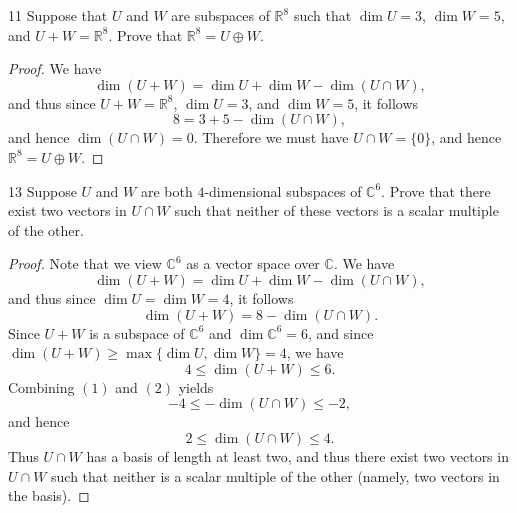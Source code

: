 \documentclass[11pt]{extarticle}
\newenvironment{problem}[1]{\begin{prob*}{#1}{}}{\end{prob*}}
\newcommand{\R}{\mathbb{R}}
\newcommand{\C}{\mathbb{C}}
\begin{document}
\begin{problem}{11}
Suppose that $U$ and $W$ are subspaces of $\R^8$ such that $\dim U = 3$, $\dim W = 5$, and $U+W=\R^8$.  Prove that $\R^8=U\oplus W$.  
\end{problem}
\begin{proof}
We have
\begin{equation*}
\dim(U + W) = \dim U + \dim W - \dim(U\cap W),
\end{equation*}
and thus since $U + W =\R^8$, $\dim U = 3$, and $\dim W = 5$, it follows
\begin{equation*}
8 = 3 + 5 - \dim(U\cap W),
\end{equation*}
and hence $\dim(U\cap W) = 0$.  Therefore we must have $U\cap W = \{0\}$, and hence $\R^8=U\oplus W$.
\end{proof}

\begin{problem}{13}
Suppose $U$ and $W$ are both $4$-dimensional subspaces of $\C^6$.  Prove that there exist two vectors in $U\cap W$ such that neither of these vectors is a scalar multiple of the other.
\end{problem}
\begin{proof}
Note that we view $\C^6$ as a vector space over $\C$.  We have
\begin{equation*}
\dim(U + W) = \dim U + \dim W - \dim(U\cap W),
\end{equation*}
and thus since $\dim U = \dim W = 4$, it follows
\begin{equation}
\dim(U+W) = 8  - \dim(U \cap W).
\end{equation}
Since $U+W$ is a subspace of $\C^6$ and $\dim \C^6 = 6$, and since $\dim(U+W)\geq \max\{\dim U, \dim W\} = 4$, we have
\begin{equation}
4\leq \dim(U + W)\leq 6.
\end{equation}
Combining $(1)$ and $(2)$ yields
\begin{equation*}
-4 \leq -\dim(U\cap W) \leq -2,
\end{equation*}
and hence 
\begin{equation*}
2 \leq \dim(U\cap W)\leq 4.
\end{equation*}
Thus $U\cap W$ has a basis of length at least two, and thus there exist two vectors in $U\cap W$ such that neither is a scalar multiple of the other (namely, two vectors in the basis).
\end{proof}
\end{document}
